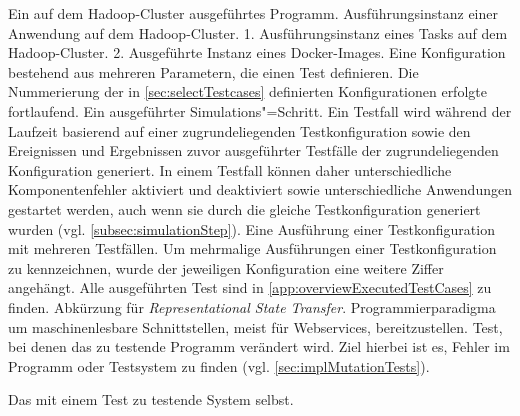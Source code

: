     {Ein auf dem Hadoop-Cluster ausgeführtes Programm.}
    {Ausführungsinstanz einer Anwendung auf dem Hadoop-Cluster.}
    {1. Ausführungsinstanz eines Tasks auf dem Hadoop-Cluster.
        2. Ausgeführte Instanz eines Docker-Images.}
    {Eine Konfiguration bestehend aus mehreren Parametern, die einen Test definieren.
        Die Nummerierung der in \cref{sec:selectTestcases} definierten Konfigurationen erfolgte fortlaufend.}
    {Ein ausgeführter Simulations"=Schritt.
        Ein Testfall wird während der Laufzeit basierend auf einer zugrundeliegenden Testkonfiguration sowie den Ereignissen und Ergebnissen zuvor ausgeführter Testfälle der zugrundeliegenden Konfiguration generiert.
        In einem Testfall können daher unterschiedliche Komponentenfehler aktiviert und deaktiviert sowie unterschiedliche Anwendungen gestartet werden, auch wenn sie durch die gleiche Testkonfiguration generiert wurden (vgl. \cref{subsec:simulationStep}).}
    {Eine Ausführung einer Testkonfiguration mit mehreren Testfällen.
        Um mehrmalige Ausführungen einer Testkonfiguration zu kennzeichnen, wurde der jeweiligen Konfiguration eine weitere Ziffer angehängt.
        Alle ausgeführten Test sind in \cref{app:overviewExecutedTestCases} zu finden.}
    {Abkürzung für \emph{Representational State Transfer}.
        Programmierparadigma um maschinenlesbare Schnittstellen, meist für Webservices, bereitzustellen.}
    {Test, bei denen das zu testende Programm verändert wird.
        Ziel hierbei ist es, Fehler im Programm oder Testsystem zu finden (vgl. \cref{sec:implMutationTests}).}

    {Das mit einem Test zu testende System selbst.}
